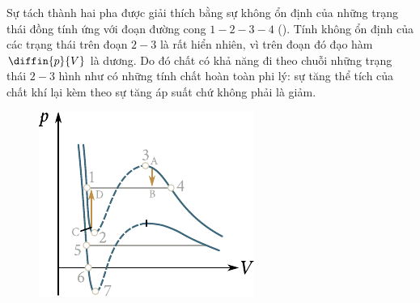 Sự tách thành hai pha được giải thích bằng sự không ổn định của những trạng thái đồng tính ứng với đoạn đường cong $1-2-3-4$ (). Tính không ổn định của các trạng thái trên đoạn $2-3$ là rất hiển nhiên, vì trên đoạn đó đạo hàm $\diffin{p}{V}$ là dương. Do đó chất có khả năng đi theo chuỗi những trạng thái $2-3$ hình như có những tính chất hoàn toàn phi lý: sự tăng thể tích của chất khí lại kèm theo sự tăng áp suất chứ không phải là giảm.\\


\begin{figure}[!htb]
	\begin{center}
		\includegraphics[scale=1]{figures/ch_15/fig_15_10.pdf}
		\caption[]{}
		\label{fig:15_10}
	\end{center}
	\vspace{-0.8cm}
\end{figure}

